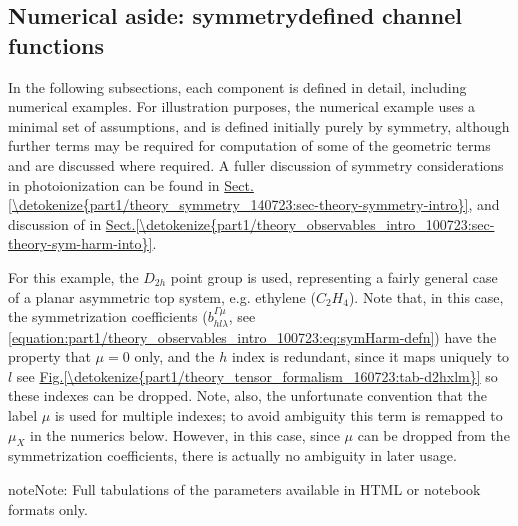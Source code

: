 \documentclass[letterpaper,table,10pt,english]{jupyterBook}
\begin{document}
\subsection{Numerical aside: symmetry\sphinxhyphen{}defined channel functions}
\label{\detokenize{part1/theory_tensor_formalism_160723:numerical-aside-symmetry-defined-channel-functions}}
\sphinxAtStartPar
In the following sub\sphinxhyphen{}sections, each component is defined in detail, including numerical examples. For illustration purposes, the numerical example uses a minimal set of assumptions, and is defined initially purely by symmetry, although further terms may be required for computation of some of the geometric terms and are discussed where required. A fuller discussion of symmetry considerations in photoionization can be found in \hyperref[\detokenize{part1/theory_symmetry_140723:sec-theory-symmetry-intro}]{Sect.\@ \ref{\detokenize{part1/theory_symmetry_140723:sec-theory-symmetry-intro}}}, and discussion of {\hyperref[\detokenize{backmatter/glossary:term-symmetrized-harmonics}]{}} in \hyperref[\detokenize{part1/theory_observables_intro_100723:sec-theory-sym-harm-into}]{Sect.\@ \ref{\detokenize{part1/theory_observables_intro_100723:sec-theory-sym-harm-into}}}.

\sphinxAtStartPar
For this example, the \(D_{2h}\) point group is used, representing a fairly general case of a planar asymmetric top system, e.g. ethylene (\(C_2H_4\)). Note that, in this case, the symmetrization coefficients (\(b_{hl\lambda}^{\Gamma\mu}\), see \eqref{equation:part1/theory_observables_intro_100723:eq:symHarm-defn}) have the property that \(\mu=0\) only, and the \(h\) index is redundant, since it maps uniquely to \(l\) \sphinxhyphen{} see \hyperref[\detokenize{part1/theory_tensor_formalism_160723:tab-d2hxlm}]{Fig.\@ \ref{\detokenize{part1/theory_tensor_formalism_160723:tab-d2hxlm}}} \sphinxhyphen{} so these indexes can be dropped. Note, also, the unfortunate convention that the label \(\mu\) is used for multiple indexes; to avoid ambiguity this term is remapped to \(\mu_X\) in the numerics below. However, in this case, since \(\mu\) can be dropped from the symmetrization coefficients, there is actually no ambiguity in later usage.

\begin{sphinxShadowBox}
\sphinxstylesidebartitle{}

\begin{sphinxadmonition}{note}{Note:}
\sphinxAtStartPar
Full tabulations of the parameters available in HTML or notebook formats only.
\end{sphinxadmonition}
\end{sphinxShadowBox}
\end{document}
